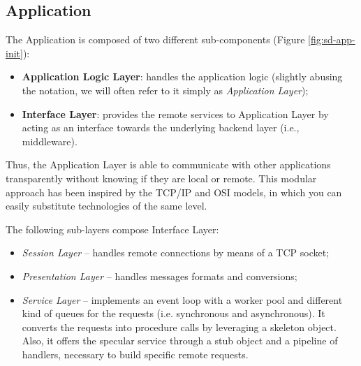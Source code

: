 \subsection{Application}
The Application is composed of two different sub-components (Figure
\ref{fig:sd-app-init}):

\begin{itemize}
  \item \textbf{Application Logic Layer}: handles the application logic
    (slightly abusing the notation, we will often refer to it simply as
    \textit{Application Layer});
  \item \textbf{Interface Layer}: provides the remote services to Application
    Layer by acting as an interface towards the underlying backend layer (i.e.,
    middleware).
\end{itemize}

Thus, the Application Layer is able to communicate with other applications
transparently without knowing if they are local or remote. This modular
approach has been inspired by the TCP/IP and OSI models, in which you can
easily substitute technologies of the same level.

The following sub-layers compose Interface Layer:

\begin{itemize}
  \item \textit{Session Layer} --
  handles remote connections by means of a TCP socket;
  \item \textit{Presentation Layer} --
  handles messages formats and conversions;
  \item \textit{Service Layer} --
  implements an event loop with a worker pool and different kind of queues
  for the requests (i.e. synchronous and asynchronous). It converts the
  requests into procedure calls by leveraging a skeleton object.
  Also, it offers the specular service through a stub object and a pipeline
  of handlers, necessary to build specific remote requests.
\end{itemize}




